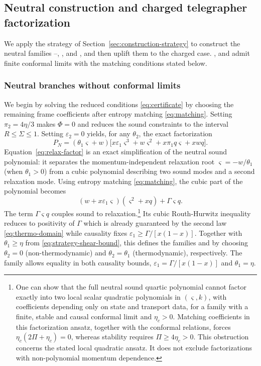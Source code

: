 \subsection{Neutral construction and charged telegrapher factorization}\label{sec:factorization}
We apply the strategy of Section~\ref{sec:construction-strategy} to
construct the neutral families --, ,  and , and then uplift
them to the charged case. ,  and  admit finite conformal limits
with the matching conditions stated below.

\subsubsection{Neutral branches without conformal limits}
\label{sec:neutral-branches-overview}
We begin by solving the reduced conditions \eqref{eq:certificate} by choosing the
remaining frame coefficients after entropy matching \eqref{eq:matching}. Setting $\pi_2=4\eta/3$ makes $\Phi=0$ and reduces the sound
constraints to the interval $R\leq\Sigma\leq1$. Setting $\varepsilon_2=0$ yields, for any $\theta_2$, the exact factorization
\begin{equation}\label{eq:relax-factor}
 P_N=(\theta_1\varsigma+w)\bigl[x\varepsilon_1\varsigma^3+w\varsigma^2+x\pi_1q\varsigma+xwq\bigr].
\end{equation}
Equation~\eqref{eq:relax-factor} is an exact simplification of the neutral sound polynomial:
it separates the momentum-independent relaxation root $\varsigma=-w/\theta_1$
(when $\theta_1>0$) from a cubic polynomial describing two sound modes and a second relaxation mode.
Using entropy matching \eqref{eq:matching}, the cubic part of the polynomial becomes
\[
 (w+x\varepsilon_1\varsigma)(\varsigma^2+xq)+\Gamma \varsigma q.
\]
The term $\Gamma \varsigma q$ couples sound to relaxation.\footnote{\label{fn:neutral-quadratic-obstruction}One can show that the full
neutral sound quartic polynomial cannot factor exactly into two local scalar quadratic
polynomials in $(\varsigma,k)$, with coefficients depending only on state
and transport data, for a family with a finite, stable and causal conformal
limit and $\eta_c>0$. Matching coefficients in this factorization ansatz,
together with the conformal relations, forces
$\eta_c(2\Pi+\eta_c)=0$, whereas stability requires $\Pi\geq4\eta_c>0$.
This obstruction concerns the stated local quadratic ansatz. It does
not exclude factorizations with non-polynomial momentum dependence.} Its cubic
Routh-Hurwitz inequality reduces to positivity of $\Gamma$ which is already guaranteed by the second law \eqref{eq:thermo-domain} while
causality fixes $\varepsilon_1\geq\Gamma/[x(1-x)]$. Together with $\theta_1\geq\eta$ from \eqref{eq:strategy-shear-bound},
this defines the families  and  by choosing $\theta_2=0$ (non-thermodynamic) and $\theta_2=\theta_1$ (thermodynamic), respectively.
The family  allows equality in both causality bounds, $\varepsilon_1=\Gamma/[x(1-x)]$ and $\theta_1=\eta$.

